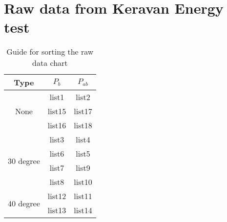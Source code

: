 \chapter{Raw data from Keravan Energy test}\label{appx:fifth}

\begin{table}[h!]
\centering
\caption{Guide for sorting the raw data chart}
\begin{tabular}{ccc}
\textbf{Type} & \textbf{$P_{b}$} & \textbf{$P_{ab}$} \\ \hline
\multirow{3}{*}{None} & list1 & list2 \\
& list15 & list17 \\
 & list16 & list18 \\ \hline
\multirow{4}{*}{30 degree} & list3 & list4 \\
& list6 & list5 \\
& list7 & list9 \\
 & list8 & list10 \\ \hline
\multirow{2}{*}{40 degree} & list12 & list11 \\
 & list13 & list14
\end{tabular}
\end{table}



